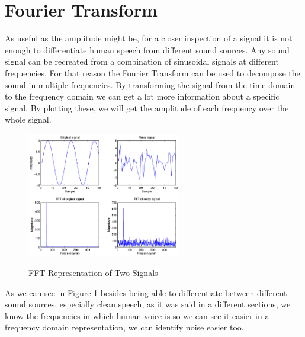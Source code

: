 \section{Fourier Transform}
As useful as the amplitude might be, for a closer inspection of a signal it is not enough to 
differentiate human speech from different sound sources. Any sound signal can be recreated from 
a combination of sinusoidal signals at different frequencies.  For that reason the Fourier 
Transform can be used to decompose the sound in multiple frequencies. By transforming the 
signal from the time domain to the frequency domain we can get a lot more information about 
a specific signal. By plotting these, we will get the amplitude of each frequency over the whole signal.

\begin{figure}[htp]
	\centering
	\includegraphics[width=0.6\textwidth]{Illustrations/fftSignals.png}
	\caption{FFT Representation of Two Signals}\cite{FFTPHOTO}
	\label{fig:fftSignal}
\end{figure}
\newpage

As we can see in Figure \ref{fig:fftSignal} besides being able to differentiate between 
different sound sources, especially clean speech, as it was said in a different sections, we 
know the frequencies in which human voice is so we can see it easier in a frequency domain representation, 
we can identify noise easier too.

